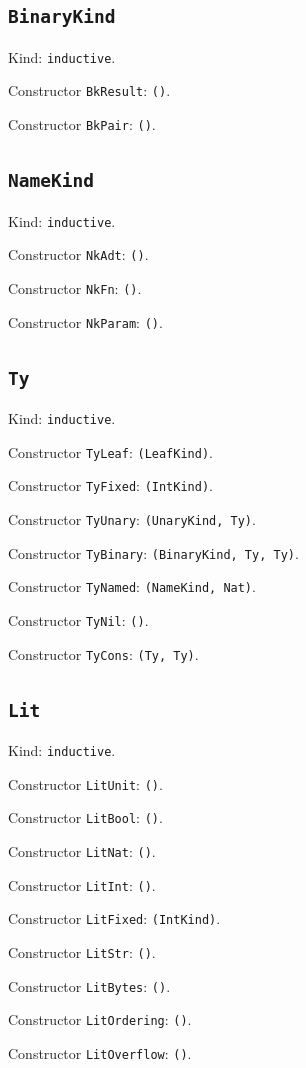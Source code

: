\documentclass[11pt]{article}
\begin{document}
\subsection*{\texttt{BinaryKind}}
\noindent Kind: \texttt{inductive}.\par
\noindent Constructor \texttt{BkResult}: \texttt{()}.\par
\noindent Constructor \texttt{BkPair}: \texttt{()}.\par
\subsection*{\texttt{NameKind}}
\noindent Kind: \texttt{inductive}.\par
\noindent Constructor \texttt{NkAdt}: \texttt{()}.\par
\noindent Constructor \texttt{NkFn}: \texttt{()}.\par
\noindent Constructor \texttt{NkParam}: \texttt{()}.\par
\subsection*{\texttt{Ty}}
\noindent Kind: \texttt{inductive}.\par
\noindent Constructor \texttt{TyLeaf}: \texttt{(LeafKind)}.\par
\noindent Constructor \texttt{TyFixed}: \texttt{(IntKind)}.\par
\noindent Constructor \texttt{TyUnary}: \texttt{(UnaryKind, Ty)}.\par
\noindent Constructor \texttt{TyBinary}: \texttt{(BinaryKind, Ty, Ty)}.\par
\noindent Constructor \texttt{TyNamed}: \texttt{(NameKind, Nat)}.\par
\noindent Constructor \texttt{TyNil}: \texttt{()}.\par
\noindent Constructor \texttt{TyCons}: \texttt{(Ty, Ty)}.\par
\subsection*{\texttt{Lit}}
\noindent Kind: \texttt{inductive}.\par
\noindent Constructor \texttt{LitUnit}: \texttt{()}.\par
\noindent Constructor \texttt{LitBool}: \texttt{()}.\par
\noindent Constructor \texttt{LitNat}: \texttt{()}.\par
\noindent Constructor \texttt{LitInt}: \texttt{()}.\par
\noindent Constructor \texttt{LitFixed}: \texttt{(IntKind)}.\par
\noindent Constructor \texttt{LitStr}: \texttt{()}.\par
\noindent Constructor \texttt{LitBytes}: \texttt{()}.\par
\noindent Constructor \texttt{LitOrdering}: \texttt{()}.\par
\noindent Constructor \texttt{LitOverflow}: \texttt{()}.\par
\end{document}
